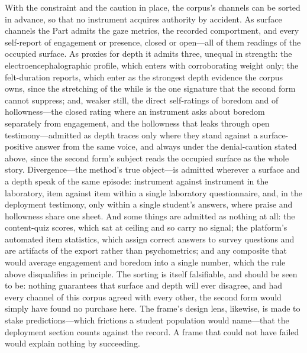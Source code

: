 With the constraint and the caution in place, the corpus's channels can be sorted in advance, so that no instrument acquires authority by accident. As surface channels the Part admits the gaze metrics, the recorded comportment, and every self-report of engagement or presence, closed or open---all of them readings of the occupied surface. As proxies for depth it admits three, unequal in strength: the electroencephalographic profile, which enters with corroborating weight only; the felt-duration reports, which enter as the strongest depth evidence the corpus owns, since the stretching of the while is the one signature that the second form cannot suppress; and, weaker still, the direct self-ratings of boredom and of hollowness---the closed rating where an instrument asks about boredom separately from engagement, and the hollowness that leaks through open testimony---admitted as depth traces only where they stand against a surface-positive answer from the same voice, and always under the denial-caution stated above, since the second form's subject reads the occupied surface as the whole story. Divergence---the method's true object---is admitted wherever a surface and a depth speak of the same episode: instrument against instrument in the laboratory, item against item within a single laboratory questionnaire, and, in the deployment testimony, only within a single student's answers, where praise and hollowness share one sheet. And some things are admitted as nothing at all: the content-quiz scores, which sat at ceiling and so carry no signal; the platform's automated item statistics, which assign correct answers to survey questions and are artifacts of the export rather than psychometrics; and any composite that would average engagement and boredom into a single number, which the rule above disqualifies in principle. The sorting is itself falsifiable, and should be seen to be: nothing guarantees that surface and depth will ever disagree, and had every channel of this corpus agreed with every other, the second form would simply have found no purchase here. The frame's design lens, likewise, is made to stake predictions---which frictions a student population would name---that the deployment section counts against the record. A frame that could not have failed would explain nothing by succeeding.

